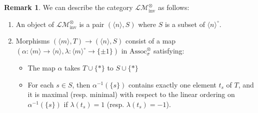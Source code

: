 \documentclass{article}
\newcommand{\Associnv}{\mathrm{Assoc}_\sigma}
\theoremstyle{definition}
\newtheorem{remark}[theorem]{Remark}
\begin{document}
\begin{remark}
    We can describe the category $ \mathcal{LM}_\mathrm{inv}^\otimes $ as follows: 
    \begin{enumerate}[label=(\arabic*)]
        \item An object of $ \mathcal{LM}_\mathrm{inv}^\otimes $ is a pair $ (\langle n\rangle,S) $ where $ S $ is a subset of $ \langle n \rangle^\circ $. 
        \item Morphisms $ (\langle m \rangle, T) \to (\langle n \rangle,S) $ consist of a map $ (\alpha \colon \langle m \rangle \to \langle n \rangle, \lambda \colon \langle m \rangle^\circ \to \{\pm 1\}) $ in $ \Associnv^\otimes $ satisfying: 
        \begin{itemize}
            \item The map $ \alpha $ takes $ T \cup \{*\} $ to $ S \cup \{*\} $
            \item For each $ s \in S $, then $ \alpha^{-1}(\{s\}) $ contains exactly one element $ t_s $ of $ T $, and it is maximal (resp. minimal) with respect to the linear ordering on $ \alpha^{-1}(\{s\}) $ if $ \lambda (t_s) = 1 $ (resp. $ \lambda(t_s) = -1 $). 
        \end{itemize}
    \end{enumerate}
\end{remark}
\end{document}
